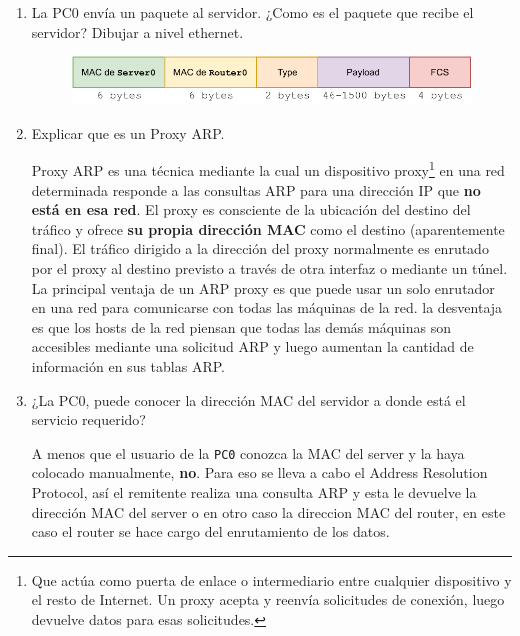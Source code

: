\begin{enumerate}

\item {\color{red} La PC0 envía un paquete al servidor. ¿Como es el paquete que recibe el servidor? Dibujar a nivel ethernet.}

\begin{figure}[ht!]
\centering
\includegraphics[scale=0.85]{Imagenes/ethernet.pdf}
\end{figure}

\item {\color{red} Explicar que es un Proxy ARP.}

Proxy ARP\cite{net} es una técnica mediante la cual un dispositivo proxy\footnote{Que actúa como puerta de enlace o intermediario entre cualquier dispositivo y el resto de Internet. Un proxy acepta y reenvía solicitudes de conexión, luego devuelve datos para esas solicitudes.} en una red determinada responde a las consultas ARP para una dirección IP que \textbf{no está en esa red}. El proxy es consciente de la ubicación del destino del tráfico y ofrece \textbf{su propia dirección MAC} como el destino (aparentemente final). El tráfico dirigido a la dirección del proxy normalmente es enrutado por el proxy al destino previsto a través de otra interfaz o mediante un túnel. \\

La principal ventaja de un ARP proxy es que puede usar un solo enrutador en una red para comunicarse con todas las máquinas de la red. la desventaja es que los hosts de la red piensan que todas las demás máquinas son accesibles mediante una solicitud ARP y luego aumentan la cantidad de información en sus tablas ARP.

\item {\color{red} ¿La PC0, puede conocer la dirección MAC del servidor a donde está el servicio requerido?}

A menos que el usuario de la \texttt{PC0} conozca la MAC del server y la haya colocado manualmente, \textbf{no}. Para eso se lleva a cabo el Address Resolution Protocol, así el remitente realiza una consulta ARP y esta le devuelve la dirección MAC del server o en otro caso la direccion MAC del router\cite{cisco}, en este caso el router se hace cargo del enrutamiento de los datos.

\end{enumerate}

